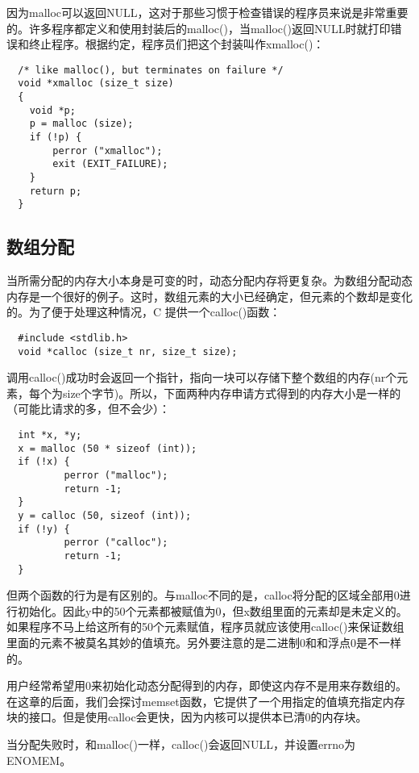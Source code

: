 因为malloc可以返回NULL，这对于那些习惯于检查错误的程序员来说是非常重要的。许多程序都定义和使用封装后的malloc()，当malloc()返回NULL时就打印错误和终止程序。根据约定，程序员们把这个封装叫作xmalloc()：

\begin{lstlisting}
  /* like malloc(), but terminates on failure */
  void *xmalloc (size_t size)
  {
    void *p;
    p = malloc (size);
    if (!p) {
        perror ("xmalloc");
        exit (EXIT_FAILURE);
    }
    return p;
  }
\end{lstlisting}

\subsection{数组分配}

当所需分配的内存大小本身是可变的时，动态分配内存将更复杂。为数组分配动态内存是一个很好的例子。这时，数组元素的大小已经确定，但元素的个数却是变化的。为了便于处理这种情况，C 提供一个calloc()函数： 

\begin{lstlisting}
  #include <stdlib.h>
  void *calloc (size_t nr, size_t size);
\end{lstlisting}

调用calloc()成功时会返回一个指针，指向一块可以存储下整个数组的内存(nr个元素，每个为size个字节)。所以，下面两种内存申请方式得到的内存大小是一样的（可能比请求的多，但不会少）： 

\begin{lstlisting}
  int *x, *y;
  x = malloc (50 * sizeof (int));
  if (!x) {
          perror ("malloc");
          return -1;
  }
  y = calloc (50, sizeof (int));
  if (!y) {
          perror ("calloc");
          return -1;
  }
\end{lstlisting}

但两个函数的行为是有区别的。与malloc不同的是，calloc将分配的区域全部用0进行初始化。因此y中的50个元素都被赋值为0，但x数组里面的元素却是未定义的。如果程序不马上给这所有的50个元素赋值，程序员就应该使用calloc()来保证数组里面的元素不被莫名其妙的值填充。另外要注意的是二进制0和和浮点0是不一样的。

用户经常希望用0来初始化动态分配得到的内存，即使这内存不是用来存数组的。在这章的后面，我们会探讨memset函数，它提供了一个用指定的值填充指定内存块的接口。但是使用calloc会更快，因为内核可以提供本已清0的内存块。

当分配失败时，和malloc()一样，calloc()会返回NULL，并设置errno为ENOMEM。

